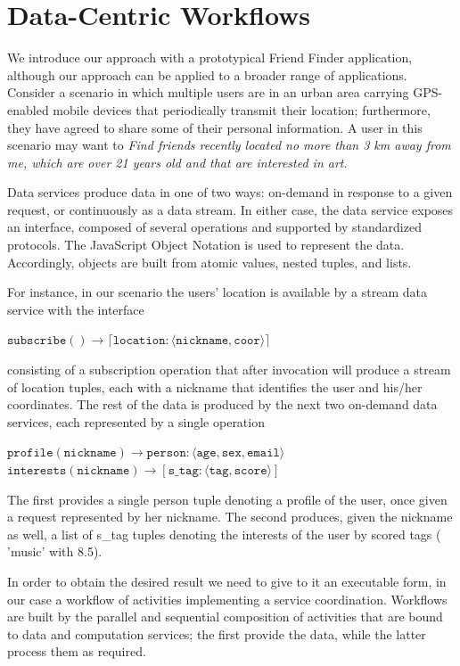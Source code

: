 
\section{Data-Centric Workflows}\label{sec:dataCentricWorkflows}

We introduce our approach with a prototypical Friend Finder application, although our approach can be applied to a broader range of applications. Consider a scenario in which multiple users are in an urban area carrying GPS-enabled mobile devices that periodically transmit their location; furthermore, they have agreed to share some of their personal information. A user in this scenario may want to \textit{Find friends recently located no more than 3 km away from me, which are over 21 years old and that are interested in art}.

Data services produce data in one of two ways: on-demand in response to a given request, or continuously as a data stream. In either case, the data service exposes an interface, composed of several operations and supported by standardized protocols. The JavaScript Object Notation is used to represent the data. Accordingly, objects are built from atomic values, nested tuples, and lists.

For instance, in our scenario the users' location is available by a stream data service with the interface
	
$\mathtt{subscribe() \rightarrow \lceil location:\langle nickname, coor\rangle\rceil}$
	
\noindent consisting of a subscription operation that after invocation will produce a stream of location tuples, each with a nickname that identifies the user and his/her coordinates. The rest of the data is produced by the next two on-demand data services, each represented by a single operation
	
$\mathtt{profile(nickname) \rightarrow person:\langle age, sex, email\rangle}$
\\
\hspace*{0.50cm}$\mathtt{interests(nickname) \rightarrow \left[s\_tag:\langle tag, score\rangle\right]}$

The first provides a single person tuple denoting a profile of the user, once given a request represented by her nickname. The second produces, given the nickname as well, a list of s\_tag tuples denoting the interests of the user by scored tags (\eg{} 'music' with 8.5).
	
In order to obtain the desired result we need to give to it an executable form, in our case a workflow of activities implementing a service coordination. Workflows are built by the parallel and sequential composition of activities that are bound to data and computation services; the first provide the data, while the latter process them as required.

